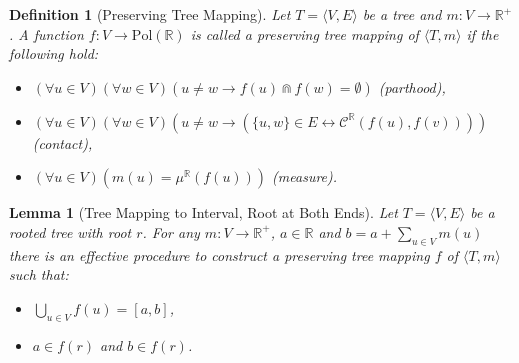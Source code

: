 \documentclass{article}
\newtheorem*{definition}{Definition}
\newtheorem*{lemma}{Lemma}
\newcommand{\R}{\mathbb{R}}
\newcommand{\bcap}{\Cap}
\newcommand{\bcont}{\mathcal{C}^\R}
\newcommand{\Pol}{\text{Pol}}
\begin{document}
\begin{definition}[Preserving Tree Mapping]
  Let $T = \langle V, E \rangle$ be a tree and $m : V \rightarrow \R^+$.
  A function $f : V \rightarrow \Pol(\R)$ is called a \emph{preserving tree mapping} of $\langle T, m \rangle$ if the following hold:
  \begin{itemize}
  \item $(\forall u \in V)(\forall w \in V)(u \neq w \rightarrow f(u) \bcap f(w) = \emptyset)$ (parthood),
  \item $(\forall u \in V)(\forall w \in V)(u \neq w \rightarrow (\{u, w\} \in E \leftrightarrow \bcont(f(u), f(v))))$ (contact),
  \item $(\forall u \in V)(m(u) = \mu^\R(f(u)))$ (measure).
  \end{itemize}
\end{definition}
\begin{lemma}[Tree Mapping to Interval, Root at Both Ends]
  Let $T = \langle V, E \rangle$ be a rooted tree with root $r$. For any $m : V \rightarrow \R^+$, $a \in \R$ and $b = a + \sum_{u \in V}m(u)$ there is an effective procedure to construct a preserving tree mapping $f$ of $\langle T, m \rangle$ such that:
  \begin{itemize}
  \item $\bigcup_{u \in V}f(u) = [a, b]$,
  \item $a \in f(r)$ and $b \in f(r)$.
  \end{itemize}
\end{lemma}
\end{document}
